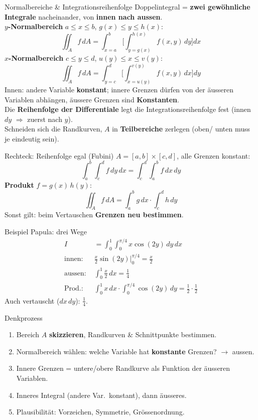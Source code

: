\documentclass[a4paper, fontsize=7pt]{scrartcl}
\begin{document}
\begin{mainbox}{Normalbereiche \& Integrationsreihenfolge}
Doppelintegral = \textbf{zwei gewöhnliche Integrale} nacheinander, von
\textbf{innen nach aussen}.\\[2pt]
\textbf{$y$-Normalbereich} $a \le x \le b$, $g(x) \le y \le h(x)$:
$$\iint_A f\, dA = \int_{x=a}^{b} \Bigg[\int_{y=g(x)}^{h(x)} f(x, y)\,
dy\Bigg] dx$$
\textbf{$x$-Normalbereich} $c \le y \le d$, $u(y) \le x \le v(y)$:
$$\iint_A f\, dA = \int_{y=c}^{d} \Bigg[\int_{x=u(y)}^{v(y)} f(x, y)\,
dx\Bigg] dy$$
Innen: andere Variable \textbf{konstant}; innere Grenzen dürfen von der
äusseren Variablen abhängen, äussere Grenzen sind \textbf{Konstanten}.\\
Die \textbf{Reihenfolge der Differentiale} legt die Integrationsreihenfolge
fest (innen $dy$ $\Rightarrow$ zuerst nach $y$).\\
Schneiden sich die Randkurven, $A$ in \textbf{Teilbereiche} zerlegen (oben/
unten muss je eindeutig sein).
\end{mainbox}

\begin{mainbox}{Rechteck: Reihenfolge egal (Fubini)}
$A = [a, b] \times [c, d]$, alle Grenzen konstant:
$$\int_a^b \!\! \int_c^d f\, dy\, dx = \int_c^d \!\! \int_a^b f\, dx\, dy$$
\textbf{Produkt} $f = g(x)\, h(y)$:
$$\iint_A f\, dA = \int_a^b g\, dx \cdot \int_c^d h\, dy$$
Sonst gilt: beim Vertauschen \textbf{Grenzen neu bestimmen}.
\end{mainbox}

\begin{subbox}{Beispiel Papula: drei Wege}
\begin{align*}
I &= \int_0^1 \! \int_0^{\pi/4} x \cos(2y)\, dy\, dx\\
\text{innen: } & \tfrac{x}{2}\sin(2y)\Big|_0^{\pi/4} = \tfrac x2\\
\text{aussen: } & \int_0^1 \tfrac x2\, dx = \tfrac14\\
\text{Prod.: } & \int_0^1 x\,dx \cdot \int_0^{\pi/4} \cos(2y)\,dy
  = \tfrac12 \cdot \tfrac12
\end{align*}
Auch vertauscht ($dx\,dy$): $\frac14$.
\end{subbox}

\begin{subbox}{Denkprozess}
\begin{enumerate}
    \item Bereich $A$ \textbf{skizzieren}, Randkurven \& Schnittpunkte
          bestimmen.
    \item Normalbereich wählen: welche Variable hat \textbf{konstante}
          Grenzen? $\to$ aussen.
    \item Innere Grenzen = untere/obere Randkurve als Funktion der
          äusseren Variablen.
    \item Inneres Integral (andere Var.\ konstant), dann äusseres.
    \item Plausibilität: Vorzeichen, Symmetrie, Grössenordnung.
\end{enumerate}
\end{subbox}
\end{document}
